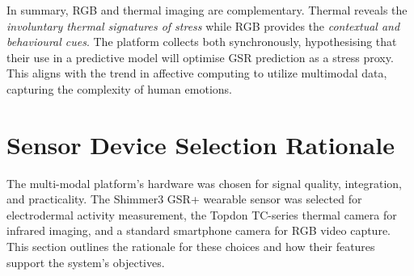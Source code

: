 In summary, RGB and thermal imaging are complementary. Thermal reveals the \emph{involuntary thermal signatures of stress} while RGB provides the \emph{contextual and behavioural cues}. The platform collects both synchronously, hypothesising that their use in a predictive model will optimise GSR prediction as a stress proxy. This aligns with the trend in affective computing to utilize multimodal data, capturing the complexity of human emotions.

\section{Sensor Device Selection Rationale}
The multi-modal platform's hardware was chosen for signal quality, integration, and practicality. The Shimmer3 GSR+ wearable sensor was selected for electrodermal activity measurement, the Topdon TC-series thermal camera for infrared imaging, and a standard smartphone camera for RGB video capture. This section outlines the rationale for these choices and how their features support the system's objectives.

